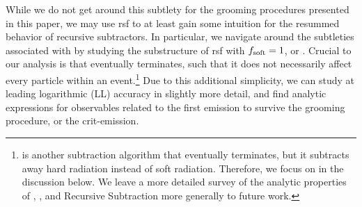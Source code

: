 While we do not get around this subtlety for the \PIRANHA{} grooming procedures presented in this paper, we may use \gls{rsf} to at least gain some intuition for the resummed behavior of recursive subtractors.
%
In particular, we navigate around the subtleties associated with \PIRANHA{} by studying the substructure of \gls{rsf} with \(f_{\rm soft} = 1\), or .
%
Crucial to our analysis is that  eventually terminates, such that it does not necessarily affect every particle within an event.\footnote{
 is another subtraction algorithm that eventually terminates, but it subtracts away hard radiation instead of soft radiation.
%
Therefore, we focus on  in the discussion below.
%
We leave a more detailed survey of the analytic properties of , , and Recursive Subtraction more generally to future work.
}
%
Due to this additional simplicity, we can study  at leading logarithmic (LL) accuracy in slightly more detail, and find analytic expressions for observables related to the first emission to survive the grooming procedure, or the \gls{crit-emission}.


